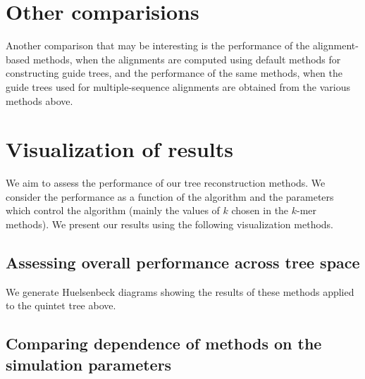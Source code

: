 \documentclass[12pt]{article}
\theoremstyle{definition}
\begin{document}
%

\section{Other comparisions}

Another comparison that may be interesting is the performance of the alignment-based methods, when the alignments are computed using default methods for constructing guide trees, and the performance of the same methods, when the guide trees used for multiple-sequence alignments are obtained from the various methods above.

\section{Visualization of results}

We aim to assess the performance of our tree reconstruction methods.
We consider the performance as a function of the algorithm and the parameters which control the algorithm (mainly the values of $k$ chosen in the $k$-mer methods).
We present our results using the following visualization methods.

\subsection{Assessing overall performance across tree space}

We generate Huelsenbeck diagrams showing the results of these methods applied to the quintet tree above.

\subsection{Comparing dependence of methods on the simulation parameters}
\end{document}
